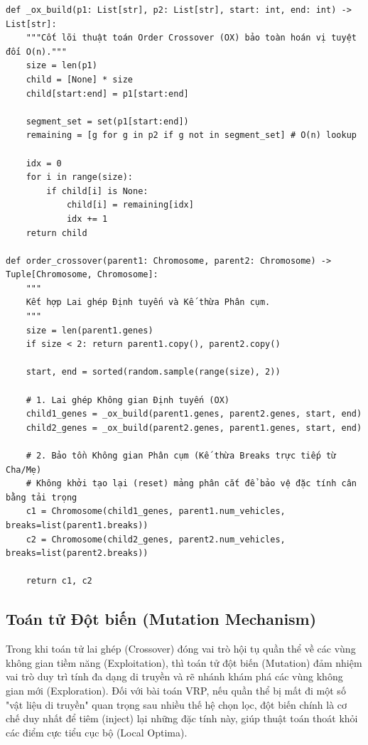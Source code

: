 \documentclass[12pt,a4paper]{article}
\numberwithin{figure}{subsection}
\begin{document}
\begin{verbatim}
def _ox_build(p1: List[str], p2: List[str], start: int, end: int) -> List[str]:
    """Cốt lõi thuật toán Order Crossover (OX) bảo toàn hoán vị tuyệt đối O(n)."""
    size = len(p1)
    child = [None] * size
    child[start:end] = p1[start:end]
    
    segment_set = set(p1[start:end])
    remaining = [g for g in p2 if g not in segment_set] # O(n) lookup

    idx = 0
    for i in range(size):
        if child[i] is None:
            child[i] = remaining[idx]
            idx += 1
    return child

def order_crossover(parent1: Chromosome, parent2: Chromosome) -> Tuple[Chromosome, Chromosome]:
    """
    Kết hợp Lai ghép Định tuyến và Kế thừa Phân cụm.
    """
    size = len(parent1.genes)
    if size < 2: return parent1.copy(), parent2.copy()

    start, end = sorted(random.sample(range(size), 2))
    
    # 1. Lai ghép Không gian Định tuyến (OX)
    child1_genes = _ox_build(parent1.genes, parent2.genes, start, end)
    child2_genes = _ox_build(parent2.genes, parent1.genes, start, end)

    # 2. Bảo tồn Không gian Phân cụm (Kế thừa Breaks trực tiếp từ Cha/Mẹ)
    # Không khởi tạo lại (reset) mảng phân cắt để bảo vệ đặc tính cân bằng tải trọng
    c1 = Chromosome(child1_genes, parent1.num_vehicles, breaks=list(parent1.breaks))
    c2 = Chromosome(child2_genes, parent2.num_vehicles, breaks=list(parent2.breaks))

    return c1, c2
\end{verbatim}



\subsection{Toán tử Đột biến (Mutation Mechanism)}

Trong khi toán tử lai ghép (Crossover) đóng vai trò hội tụ quần thể về các vùng không gian tiềm năng (Exploitation), thì toán tử đột biến (Mutation) đảm nhiệm vai trò duy trì tính đa dạng di truyền và rẽ nhánh khám phá các vùng không gian mới (Exploration). Đối với bài toán VRP, nếu quần thể bị mất đi một số "vật liệu di truyền" quan trọng sau nhiều thế hệ chọn lọc, đột biến chính là cơ chế duy nhất để tiêm (inject) lại những đặc tính này, giúp thuật toán thoát khỏi các điểm cực tiểu cục bộ (Local Optima).
\end{document}
